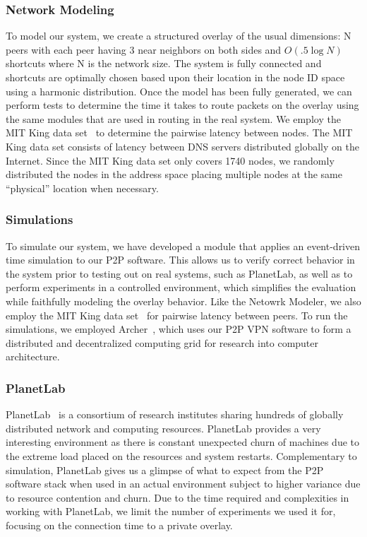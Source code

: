 \documentclass[conference]{IEEEtran}
\begin{document}
\subsubsection{Network Modeling}
To model our system, we create a structured overlay of the usual dimensions:
N peers with each peer having 3 near neighbors on both sides and $O(.5\log N)$
shortcuts where N is the network size.  The system is fully connected and
shortcuts are optimally chosen based upon their location in the node ID space
using a harmonic distribution.  Once the model has been fully generated, we can
perform tests to determine the time it takes to route packets on the overlay
using the same modules that are used in routing in the real system.  We employ
the MIT King data set~\cite{king_data} to determine the pairwise latency
between nodes.  The MIT King data set consists of latency between DNS servers
distributed globally on the Internet.  Since the MIT King data set only covers
1740 nodes, we randomly distributed the nodes in the address space placing
multiple nodes at the same ``physical'' location when necessary.

\subsubsection{Simulations}
To simulate our system, we have developed a module that applies an event-driven
time simulation to our P2P software.  This allows us to verify correct behavior
in the system prior to testing out on real systems, such as PlanetLab, as well
as to perform experiments in a controlled environment, which simplifies the
evaluation while faithfully modeling the overlay behavior.  Like the Netowrk
Modeler, we also employ the MIT King data set~\cite{king_data} for pairwise
latency between peers.  To run the simulations, we employed Archer~\cite{archer},
which uses our P2P VPN software to form a distributed and decentralized
computing grid for research into computer architecture.

\subsubsection{PlanetLab}
PlanetLab~\cite{planetlab} is a consortium of research institutes sharing
hundreds of globally distributed network and computing resources.  PlanetLab
provides a very interesting environment as there is constant unexpected churn
of machines due to the extreme load placed on the resources and system restarts.
Complementary to simulation, PlanetLab gives us a glimpse of what to expect from the
P2P software stack when used in an actual environment subject to higher variance due to resource contention and churn.
Due to the time required and complexities in
working with PlanetLab, we limit the number of experiments we used it for,
focusing on the connection time to a private overlay.
\end{document}
